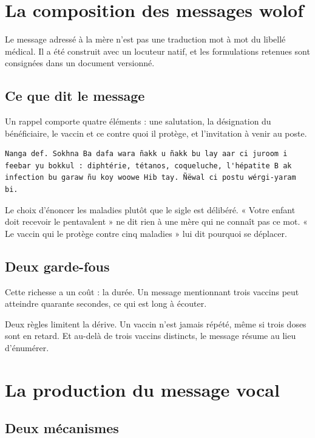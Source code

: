 \documentclass[11pt,a4paper]{report}
\begin{document}
\section{La composition des messages wolof}

Le message adressé à la mère n'est pas une traduction mot à mot du libellé
médical. Il a été construit avec un locuteur natif, et les formulations
retenues sont consignées dans un document versionné.

\subsection{Ce que dit le message}

Un rappel comporte quatre éléments : une salutation, la désignation du
bénéficiaire, le vaccin et ce contre quoi il protège, et l'invitation à
venir au poste.

\begin{lstlisting}
Nanga def. Sokhna Ba dafa wara ñakk u ñakk bu lay aar ci juroom i
feebar yu bokkul : diphtérie, tétanos, coqueluche, l'hépatite B ak
infection bu garaw ñu koy woowe Hib tay. Ñëwal ci postu wérgi-yaram bi.
\end{lstlisting}

Le choix d'énoncer les maladies plutôt que le sigle est délibéré. « Votre
enfant doit recevoir le pentavalent » ne dit rien à une mère qui ne connaît
pas ce mot. « Le vaccin qui le protège contre cinq maladies » lui dit
pourquoi se déplacer.

\subsection{Deux garde-fous}

Cette richesse a un coût : la durée. Un message mentionnant trois vaccins
peut atteindre quarante secondes, ce qui est long à écouter.

Deux règles limitent la dérive. Un vaccin n'est jamais répété, même si trois
doses sont en retard. Et au-delà de trois vaccins distincts, le message
résume au lieu d'énumérer.

\section{La production du message vocal}

\subsection{Deux mécanismes}
\end{document}
